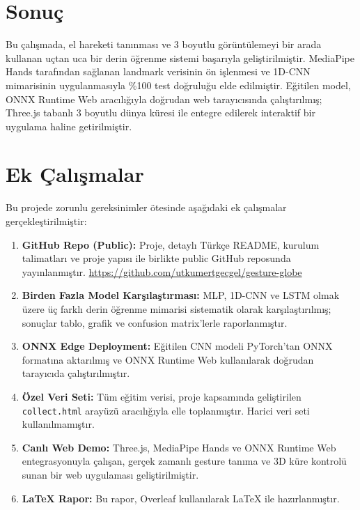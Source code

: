 \documentclass[12pt,a4paper]{article}
\begin{document}
\section{Sonuç}

Bu çalışmada, el hareketi tanınması ve 3 boyutlu görüntülemeyi bir arada kullanan uçtan uca bir derin öğrenme sistemi başarıyla geliştirilmiştir. MediaPipe Hands tarafından sağlanan landmark verisinin ön işlenmesi ve 1D-CNN mimarisinin uygulanmasıyla \%100 test doğruluğu elde edilmiştir. Eğitilen model, ONNX Runtime Web aracılığıyla doğrudan web tarayıcısında çalıştırılmış; Three.js tabanlı 3 boyutlu dünya küresi ile entegre edilerek interaktif bir uygulama haline getirilmiştir.

\section{Ek Çalışmalar}

Bu projede zorunlu gereksinimler ötesinde aşağıdaki ek çalışmalar gerçekleştirilmiştir:

\begin{enumerate}
    \item \textbf{GitHub Repo (Public):} Proje, detaylı Türkçe README, kurulum talimatları ve proje yapısı ile birlikte public GitHub reposunda yayınlanmıştır. \url{https://github.com/utkumertgecgel/gesture-globe}
    \item \textbf{Birden Fazla Model Karşılaştırması:} MLP, 1D-CNN ve LSTM olmak üzere üç farklı derin öğrenme mimarisi sistematik olarak karşılaştırılmış; sonuçlar tablo, grafik ve confusion matrix'lerle raporlanmıştır.
    \item \textbf{ONNX Edge Deployment:} Eğitilen CNN modeli PyTorch'tan ONNX formatına aktarılmış ve ONNX Runtime Web kullanılarak doğrudan tarayıcıda çalıştırılmıştır.
    \item \textbf{Özel Veri Seti:} Tüm eğitim verisi, proje kapsamında geliştirilen \texttt{collect.html} arayüzü aracılığıyla elle toplanmıştır. Harici veri seti kullanılmamıştır.
    \item \textbf{Canlı Web Demo:} Three.js, MediaPipe Hands ve ONNX Runtime Web entegrasyonuyla çalışan, gerçek zamanlı gesture tanıma ve 3D küre kontrolü sunan bir web uygulaması geliştirilmiştir.
    \item \textbf{LaTeX Rapor:} Bu rapor, Overleaf kullanılarak LaTeX ile hazırlanmıştır.
\end{enumerate}
\end{document}
